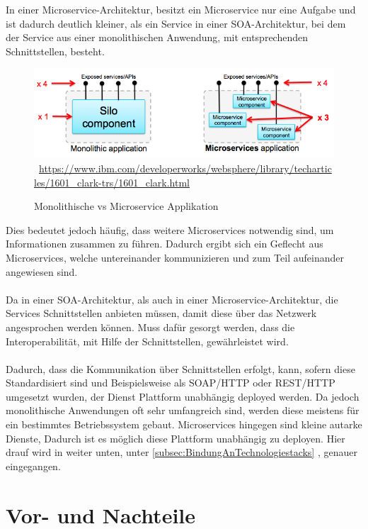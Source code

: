 In einer Microservice-Architektur, besitzt ein Microservice nur eine Aufgabe und ist dadurch deutlich kleiner, als ein Service in einer SOA-Architektur, bei dem der Service aus einer monolithischen Anwendung, mit entsprechenden Schnittstellen, besteht.
\begin{figure}[htb]
    \centering 
    \includegraphics[width=\linewidth]{content/images/MonolithicVsMicroservice}\
    \quelle\url{https://www.ibm.com/developerworks/websphere/library/techarticles/1601_clark-trs/1601_clark.html}
    \caption{Monolithische vs Microservice Applikation}
    \label{fig:MonolithicVsMicroservice} 
\end{figure}
\newpage
Dies bedeutet jedoch häufig, dass weitere Microservices notwendig sind, um Informationen zusammen zu führen. Dadurch ergibt sich ein Geflecht aus Microservices, welche untereinander kommunizieren und zum Teil aufeinander angewiesen sind.
\\\\
Da in einer SOA-Architektur, als auch in einer Microservice-Architektur, die Services Schnittstellen anbieten müssen, damit diese über das Netzwerk angesprochen werden können. Muss dafür gesorgt werden, dass die Interoperabilität, mit Hilfe der Schnittstellen, gewährleistet wird.
\\\\
Dadurch, dass die Kommunikation über Schnittstellen erfolgt, kann, sofern diese Standardisiert sind und Beispielsweise als SOAP/HTTP oder REST/HTTP umgesetzt wurden, der Dienst Plattform unabhängig deployed werden. Da jedoch monolithische Anwendungen oft sehr umfangreich sind, werden diese meistens für ein bestimmtes Betriebssystem gebaut. Microservices hingegen sind kleine autarke Dienste, Dadurch ist es möglich diese Plattform unabhängig zu deployen. Hier drauf wird in weiter unten, unter \ref{subsec:BindungAnTechnologiestacks} , genauer eingegangen.

\section{Vor- und Nachteile}
\label{sec:VorUndNachteile}


